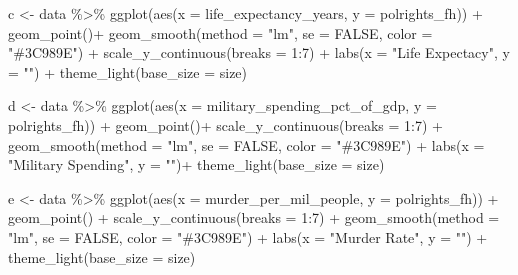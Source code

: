\documentclass[
  english,
  man,floatsintext]{apa6}
\newenvironment{Shaded}{\begin{snugshade}}{\end{snugshade}}
\newcommand{\AttributeTok}[1]{\textcolor[rgb]{0.77,0.63,0.00}{#1}}
\newcommand{\ConstantTok}[1]{\textcolor[rgb]{0.00,0.00,0.00}{#1}}
\newcommand{\DecValTok}[1]{\textcolor[rgb]{0.00,0.00,0.81}{#1}}
\newcommand{\FunctionTok}[1]{\textcolor[rgb]{0.00,0.00,0.00}{#1}}
\newcommand{\NormalTok}[1]{#1}
\newcommand{\OtherTok}[1]{\textcolor[rgb]{0.56,0.35,0.01}{#1}}
\newcommand{\SpecialCharTok}[1]{\textcolor[rgb]{0.00,0.00,0.00}{#1}}
\newcommand{\StringTok}[1]{\textcolor[rgb]{0.31,0.60,0.02}{#1}}
\begin{document}
\begin{Shaded}
\begin{Highlighting}[]
\NormalTok{c }\OtherTok{\textless{}{-}}\NormalTok{ data }\SpecialCharTok{\%\textgreater{}\%} 
  \FunctionTok{ggplot}\NormalTok{(}\FunctionTok{aes}\NormalTok{(}\AttributeTok{x =}\NormalTok{ life\_expectancy\_years, }\AttributeTok{y =}\NormalTok{ polrights\_fh)) }\SpecialCharTok{+} 
  \FunctionTok{geom\_point}\NormalTok{()}\SpecialCharTok{+} 
  \FunctionTok{geom\_smooth}\NormalTok{(}\AttributeTok{method =} \StringTok{"lm"}\NormalTok{, }\AttributeTok{se =} \ConstantTok{FALSE}\NormalTok{, }\AttributeTok{color =} \StringTok{"\#3C989E"}\NormalTok{) }\SpecialCharTok{+}
    \FunctionTok{scale\_y\_continuous}\NormalTok{(}\AttributeTok{breaks =} \DecValTok{1}\SpecialCharTok{:}\DecValTok{7}\NormalTok{) }\SpecialCharTok{+} 
  \FunctionTok{labs}\NormalTok{(}\AttributeTok{x =} \StringTok{"Life Expectacy"}\NormalTok{, }\AttributeTok{y =} \StringTok{""}\NormalTok{) }\SpecialCharTok{+}
  \FunctionTok{theme\_light}\NormalTok{(}\AttributeTok{base\_size =}\NormalTok{ size)}

\NormalTok{d }\OtherTok{\textless{}{-}}\NormalTok{ data }\SpecialCharTok{\%\textgreater{}\%} 
  \FunctionTok{ggplot}\NormalTok{(}\FunctionTok{aes}\NormalTok{(}\AttributeTok{x =}\NormalTok{ military\_spending\_pct\_of\_gdp, }\AttributeTok{y =}\NormalTok{ polrights\_fh)) }\SpecialCharTok{+} 
  \FunctionTok{geom\_point}\NormalTok{()}\SpecialCharTok{+} 
  \FunctionTok{scale\_y\_continuous}\NormalTok{(}\AttributeTok{breaks =} \DecValTok{1}\SpecialCharTok{:}\DecValTok{7}\NormalTok{) }\SpecialCharTok{+} 
  \FunctionTok{geom\_smooth}\NormalTok{(}\AttributeTok{method =} \StringTok{"lm"}\NormalTok{, }\AttributeTok{se =} \ConstantTok{FALSE}\NormalTok{, }\AttributeTok{color =} \StringTok{"\#3C989E"}\NormalTok{) }\SpecialCharTok{+} 
  \FunctionTok{labs}\NormalTok{(}\AttributeTok{x =} \StringTok{"Military Spending"}\NormalTok{, }\AttributeTok{y =} \StringTok{""}\NormalTok{)}\SpecialCharTok{+} \FunctionTok{theme\_light}\NormalTok{(}\AttributeTok{base\_size =}\NormalTok{ size)}

\NormalTok{e }\OtherTok{\textless{}{-}}\NormalTok{ data }\SpecialCharTok{\%\textgreater{}\%} 
  \FunctionTok{ggplot}\NormalTok{(}\FunctionTok{aes}\NormalTok{(}\AttributeTok{x =}\NormalTok{ murder\_per\_mil\_people, }\AttributeTok{y =}\NormalTok{ polrights\_fh)) }\SpecialCharTok{+} 
  \FunctionTok{geom\_point}\NormalTok{() }\SpecialCharTok{+} 
  \FunctionTok{scale\_y\_continuous}\NormalTok{(}\AttributeTok{breaks =} \DecValTok{1}\SpecialCharTok{:}\DecValTok{7}\NormalTok{) }\SpecialCharTok{+} 
  \FunctionTok{geom\_smooth}\NormalTok{(}\AttributeTok{method =} \StringTok{"lm"}\NormalTok{, }\AttributeTok{se =} \ConstantTok{FALSE}\NormalTok{, }\AttributeTok{color =} \StringTok{"\#3C989E"}\NormalTok{) }\SpecialCharTok{+} 
  \FunctionTok{labs}\NormalTok{(}\AttributeTok{x =} \StringTok{"Murder Rate"}\NormalTok{, }\AttributeTok{y =} \StringTok{""}\NormalTok{) }\SpecialCharTok{+} \FunctionTok{theme\_light}\NormalTok{(}\AttributeTok{base\_size =}\NormalTok{ size)}


\end{Highlighting}
\end{Shaded}
\end{document}
